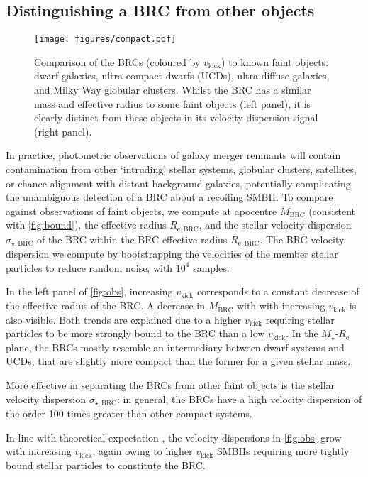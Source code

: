\documentclass[twocolumn]{aastex631}
\newcommand{\Reff}{\ensuremath{R_\mathrm{e}}}                 %
\newcommand{\vk}{\ensuremath{v_\mathrm{kick}}}                %
\newcommand{\mbound}{\ensuremath{M_\mathrm{BRC}}}           %
\newcommand{\BRCR}{\ensuremath{R_\mathrm{e,BRC}}}         %
\newcommand{\BRCV}{\ensuremath{\sigma_{\star,\mathrm{BRC}}}}    %
\begin{document}
\subsection{Distinguishing a BRC from other objects}\label{ssec:obscomp}
\begin{figure*}[t]
    \centering
    \texttt{[image: figures/compact.pdf]}
    \caption{
        Comparison of the BRCs (coloured by $\vk$) to known faint objects: dwarf galaxies, ultra-compact dwarfs (UCDs), ultra-diffuse galaxies, and Milky Way globular clusters.
        Whilst the BRC has a similar mass and effective radius to some faint objects (left panel), it is clearly distinct from these objects in its velocity dispersion signal (right panel).
    }
    \label{fig:obs}
\end{figure*}
In practice, photometric observations of galaxy merger remnants will contain contamination from other `intruding' stellar systems, globular clusters, satellites, or chance alignment with distant background galaxies, potentially complicating the unambiguous detection of a BRC about a recoiling SMBH.
To compare against observations of faint objects, we compute at apocentre $\mbound$ (consistent with \autoref{fig:bound}), the effective radius $\BRCR$, and the stellar velocity dispersion $\BRCV$ of the BRC within the BRC effective radius $\BRCR$.
The BRC velocity dispersion we compute by bootstrapping the velocities of the member stellar particles to reduce random noise, with $10^4$ samples.
\nocite{misgeld2009,price2009,harris2010,misgeld2011,mcconnachie2012,carlsten2020,siljeg2024} %

In the left panel of \autoref{fig:obs}, increasing $\vk$ corresponds to a constant decrease of the effective radius of the BRC.
A decrease in $\mbound$ with with increasing $\vk$ is also visible.
Both trends are explained due to a higher $\vk$ requiring stellar particles to be more strongly bound to the BRC than a low $\vk$.
In the $M_\star$-$\Reff$ plane, the BRCs mostly resemble an intermediary between dwarf systems and UCDs, that are slightly more compact than the former for a given stellar mass.

More effective in separating the BRCs from other faint objects is the stellar velocity dispersion $\BRCV$: in general, the BRCs have a high velocity dispersion of the order 100 times greater than other compact systems.

In line with theoretical expectation \citep[e.g.][]{merritt2009}, the velocity dispersions in \autoref{fig:obs} grow with increasing $\vk$, again owing to higher $\vk$ SMBHs requiring more tightly bound stellar particles to constitute the BRC.
\end{document}
